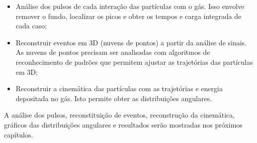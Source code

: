 \documentclass[a4paper,12pt,oneside]{book}
\begin{document}

\begin{itemize}
    \item Análise dos pulsos de cada interação das partículas com o gás. Isso envolve remover o fundo, localizar os picos e obter os tempos e carga integrada de cada caso;
    \item Reconstruir eventos em 3D (nuvens de pontos) a partir da análise de sinais. As nuvens de pontos precisam ser analisadas com algoritmos de reconhecimento de padrões que permitem ajustar as trajetórias das partículas em 3D;
    \item Reconstruir a cinemática das partículas com as trajetórias e energia depositada no gás. Isto permite obter as distribuições angulares. 
\end{itemize}


A análise dos pulsos, reconstituição de eventos, reconstrução da cinemática, gráficos das distribuições angulares e resultados serão mostradas nos próximos capítulos.

\end{document}
